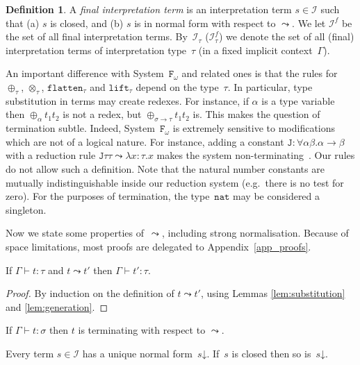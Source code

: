\documentclass[a4paper,UKenglish,cleveref,autoref,numberwithinsect]{lipics-v2019}
\theoremstyle{definition}
\newtheorem{defn}[theorem]{Definition}
\newcommand{\Fomega}{\mathtt{F}_\omega}
\newcommand{\Iterms}{\mathcal{I}}
\newcommand{\arrtype}{\rightarrow}
\newcommand{\arrW}{\leadsto}
\newcommand{\nat}{\mathtt{nat}}
\newcommand{\flatten}{\mathtt{flatten}}
\newcommand{\lift}{\mathtt{lift}}
\newcommand{\da}{\mathord{\downarrow}}
\newcommand{\proves}{\vdash}
\begin{document}
\begin{defn}
  A \emph{final interpretation term} is an interpretation term $s \in
  \Iterms$ such that (a) $s$ is closed, and (b) $s$ is in normal form
  with respect to $\arrW$.  We let $\Iterms^f$ be the set of all final
  interpretation terms. By~$\Iterms_\tau$ ($\Iterms^f_\tau$) we denote
  the set of all (final) interpretation terms of interpretation
  type~$\tau$ (in a fixed implicit context~$\Gamma$).
\end{defn}

An important difference with System~$\Fomega$ and related ones is that
the rules for $\oplus_\tau$, $\otimes_\tau$, $\flatten_\tau$ and
$\lift_\tau$ depend on the type~$\tau$. In particular, type
substitution in terms may create redexes. For instance, if $\alpha$ is
a type variable then $\oplus_\alpha t_1 t_2$ is not a redex, but
$\oplus_{\sigma\arrtype\tau} t_1 t_2$ is. This makes the question of
termination subtle. Indeed, System~$\Fomega$ is extremely sensitive to
modifications which are not of a logical nature. For instance, adding
a constant $\mathtt{J} : \forall \alpha \beta . \alpha \arrtype \beta$
with a reduction rule $\mathtt{J} \tau \tau \leadsto \lambda x : \tau
. x$ makes the system non-terminating~\cite{Girard1971}. Our rules do
not allow such a definition. Note that the natural number constants
are mutually indistinguishable inside our reduction system (e.g.~there
is no test for zero). For the purposes of termination, the type~$\nat$
may be considered a singleton.

Now we state some properties of~$\arrW$, including strong
normalisation. Because of space limitations, most proofs are
delegated to Appendix~\ref{app_proofs}.

\begin{lemma}
  If $\Gamma \proves t : \tau$ and $t \arrW t'$ then $\Gamma \proves
  t' : \tau$.
\end{lemma}

\begin{proof}
  By induction on the definition of $t \arrW t'$, using
  Lemmas \ref{lem:substitution} and \ref{lem:generation}.
\end{proof}

\begin{theorem}\label{thm_sn}
  If $\Gamma \proves t : \sigma$ then $t$ is terminating with respect
  to $\arrW$.
\end{theorem}

\begin{lemma}\label{lem_unique_final}
  Every term $s \in \Iterms$ has a unique normal form~$s\da$. If~$s$
  is closed then so is~$s\da$.
\end{lemma}
\end{document}
